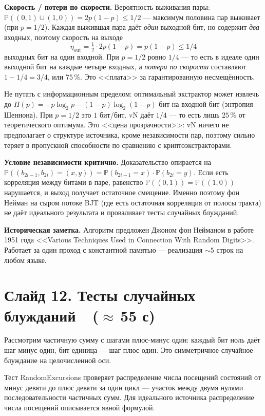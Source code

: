 \documentclass[12pt,a4paper]{extarticle}
\begin{document}
{\medskip
\textbf{Скорость / потери по скорости.}
Вероятность выживания пары:
$\mathbb{P}((0,1)\cup(1,0))=2p(1-p)\le 1/2$ --- максимум половина пар
выживает (при $p=1/2$). Каждая выжившая пара даёт \emph{один} выходной бит,
но содержит \emph{два} входных, поэтому скорость на выходе
\[
  \eta_{\text{out}} = \tfrac12 \cdot 2p(1-p) = p(1-p) \le 1/4
\]
выходных бит на один входной. При $p=1/2$ ровно $1/4$ --- то есть в идеале
один выходной бит на каждые четыре входных, а \emph{потери по скорости}
составляют $1 - 1/4 = 3/4$, или $75\,\%$. Это <<плата>> за гарантированную
несмещённость.

Не путать с информационным пределом: оптимальный экстрактор может извлечь
до $H(p) = -p\log_2 p - (1-p)\log_2(1-p)$ бит на входной бит (энтропия
Шеннона). При $p=1/2$ это $1$ бит/бит. vN даёт $1/4$ --- то есть лишь
$25\,\%$ от теоретического оптимума. Это <<цена прозрачности>>: vN ничего
не предполагает о структуре источника, кроме независимости пар, поэтому
сильно теряет в пропускной способности по сравнению с криптоэкстракторами.

\medskip
\textbf{Условие независимости критично.} Доказательство опирается на
$\mathbb{P}((b_{2i-1}, b_{2i})=(x,y)) = \mathbb{P}(b_{2i-1}=x)\cdot
\mathbb{P}(b_{2i}=y)$. Если есть корреляция между битами в паре, равенство
$\mathbb{P}((0,1)) = \mathbb{P}((1,0))$ нарушается, и выход получает
остаточное смещение. Именно поэтому фон Нейман на сыром потоке BJT (где
есть остаточная корреляция от полосы тракта) не даёт идеального результата
и проваливает тесты случайных блужданий.

\medskip
\textbf{Историческая заметка.} Алгоритм предложен Джоном фон Нейманом в
работе 1951 года <<Various Techniques Used in Connection With Random
Digits>>. Работает за один проход с константной памятью --- реализация
$\sim 5$ строк на любом языке.}

\section*{Слайд 12. Тесты случайных блужданий~~($\approx$\,55 с)}

Рассмотрим частичную сумму с шагами плюс-минус один: каждый бит ноль даёт
шаг минус один, бит единица --- шаг плюс один. Это симметричное случайное
блуждание на целочисленной оси.

Тест RandomExcursions проверяет распределение числа посещений состояний от
минус девяти до плюс девяти за один цикл --- участок между двумя нулями
последовательности частичных сумм. Для идеального источника распределение
числа посещений описывается явной формулой.
\end{document}
